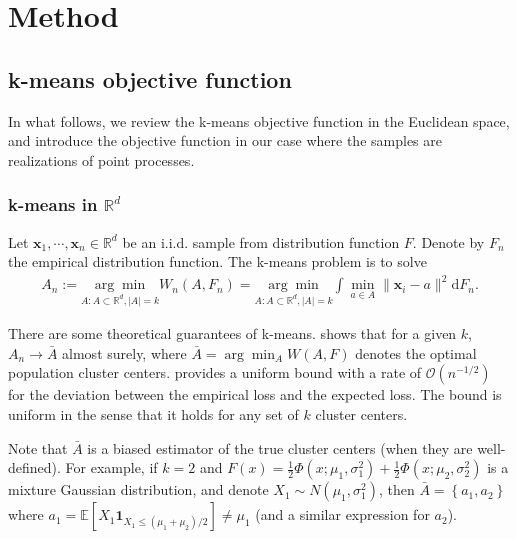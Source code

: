 

\section{Method} \label{sec:method}




	\subsection{k-means objective function}
		In what follows, we review the k-means objective function in the Euclidean space, and introduce the objective function in our case where the samples are realizations of point processes.

		\subsubsection*{k-means in $\mathbb{R}^d$} 
			Let ${\mathbf{x}_1,\cdots,\mathbf{x}_n}\in \mathbb{R}^d$ be an i.i.d. sample from distribution function $F$. Denote by $F_n$ the empirical distribution function. The k-means problem is to solve  
			\begin{align*}
			A_n:=\underset{A:A\subset \mathbb{R}^d, |A|=k}{\arg\min} W_n(A,F_n)=\underset{A:A\subset \mathbb{R}^d, |A|=k}{\arg\min}\int \min_{a\in A}\|\mathbf{x}_i-a\|^2  \text{d}F_n.
			\end{align*}

			There are some theoretical guarantees of k-means.
			\citet{Pollard1981a} shows that for a given $k$, $A_n\to \bar A $ almost surely, where $\bar A=\arg\min_A W(A,F) $ denotes the optimal population cluster centers.
			\citet{Bachem2017} provides a uniform bound with a rate of $\mathcal{O}\left(n^{-1/2}\right)$ for the deviation between the empirical loss and the expected loss. 
			The bound is uniform in the sense that it holds for any set of $k$ cluster centers.
			
			
			Note that $\bar A$ is a biased estimator of the true cluster centers (when they are well-defined).
			For example, if $k=2$ and $F(x)=\frac{1}{2}\Phi(x;\mu_1,\sigma_1^2)+\frac{1}{2}\Phi(x;\mu_2, \sigma_2^2)$ is a mixture Gaussian distribution, 
			and denote $X_1\sim N(\mu_1,\sigma_1^2)$, then $\bar A= \left\{ a_1,a_2 \right\} $ where $a_1=\mathbb{E}[X_1 \mathbf{1}_{X_1\leq (\mu_1+\mu_2)/2}]\neq \mu_1 $ (and a similar expression for $a_2$).

